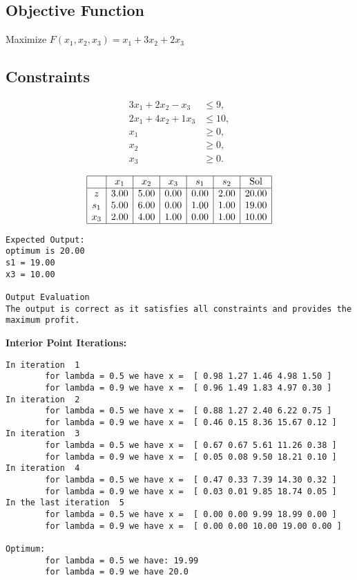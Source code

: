 \documentclass[12pt, legalpaper]{exam}
\begin{document}
\subsection*{Objective Function}
Maximize \( F(x_1, x_2, x_3) = x_1 + 3x_2 + 2x_3 \)
 
\subsection*{Constraints}
\begin{align*}
    3x_1 + 2x_2 - x_3 &\leq 9, \\
    2x_1 + 4x_2 + 1x_3 &\leq 10, \\
    x_1 &\geq 0, \\
    x_2 &\geq 0, \\
    x_3 &\geq 0.
\end{align*}
 
 
\[
\begin{array}{|c|c|c|c|c|c|c|}
\hline
    & x_1 & x_2 & x_3 & s_1 & s_2 & \text{Sol} \\
\hline
z   & 3.00 & 5.00 & 0.00 & 0.00 & 2.00 & 20.00 \\
s_1 & 5.00 & 6.00 & 0.00 & 1.00 & 1.00 & 19.00 \\
x_3 & 2.00 & 4.00 & 1.00 & 0.00 & 1.00 & 10.00 \\
\hline
\end{array}
\]
 
\begin{verbatim}
Expected Output:
optimum is 20.00
s1 = 19.00
x3 = 10.00
 
Output Evaluation
The output is correct as it satisfies all constraints and provides the maximum profit.
\end{verbatim}
 
\textbf{Interior Point Iterations:}
\begin{verbatim}
In iteration  1 
        for lambda = 0.5 we have x =  [ 0.98 1.27 1.46 4.98 1.50 ] 
        for lambda = 0.9 we have x =  [ 0.96 1.49 1.83 4.97 0.30 ]
In iteration  2 
        for lambda = 0.5 we have x =  [ 0.88 1.27 2.40 6.22 0.75 ] 
        for lambda = 0.9 we have x =  [ 0.46 0.15 8.36 15.67 0.12 ]
In iteration  3 
        for lambda = 0.5 we have x =  [ 0.67 0.67 5.61 11.26 0.38 ] 
        for lambda = 0.9 we have x =  [ 0.05 0.08 9.50 18.21 0.10 ]
In iteration  4 
        for lambda = 0.5 we have x =  [ 0.47 0.33 7.39 14.30 0.32 ] 
        for lambda = 0.9 we have x =  [ 0.03 0.01 9.85 18.74 0.05 ]
In the last iteration  5 
        for lambda = 0.5 we have x =  [ 0.00 0.00 9.99 18.99 0.00 ] 
        for lambda = 0.9 we have x =  [ 0.00 0.00 10.00 19.00 0.00 ]
 
Optimum:
        for lambda = 0.5 we have: 19.99 
        for lambda = 0.9 we have 20.0
\end{verbatim}
 
\end{document}
